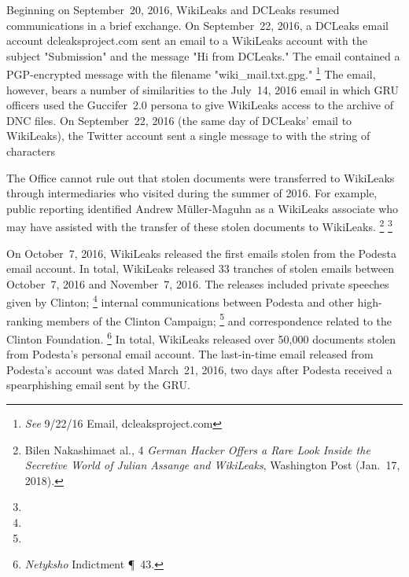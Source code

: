 Beginning on September~20, 2016, WikiLeaks and DCLeaks resumed communications in a brief exchange.
On September~22, 2016, a DCLeaks email account dcleaksproject\@gmail.com sent an email to a WikiLeaks account with the subject "Submission" and the message "Hi from DCLeaks."
The email contained a PGP-encrypted message with the filename "wiki\_mail.txt.gpg."%
\footnote{\textit{See} 9/22/16 Email, dcleaksproject\@gmail.com }
The email, however, bears a number of similarities to the July~14, 2016 email in which GRU officers used the Guccifer~2.0 persona to give WikiLeaks access to the archive of DNC files.
On September~22, 2016 (the same day of DCLeaks' email to WikiLeaks), the Twitter account \@dcleaks sent a single message to \@WikiLeaks with the string of characters 

The Office cannot rule out that stolen documents were transferred to WikiLeaks through intermediaries who visited during the summer of 2016.
For example, public reporting identified Andrew M{\"u}ller-Maguhn as a WikiLeaks associate who may have assisted with the transfer of these stolen documents to WikiLeaks.%
\footnote{Bilen Nakashimaet al., 4 \textit{German Hacker Offers a Rare Look Inside the Secretive World of Julian Assange and WikiLeaks}, Washington Post (Jan.~17, 2018).}
\footnote{}

On October~7, 2016, WikiLeaks released the first emails stolen from the Podesta email account.
In total, WikiLeaks released 33 tranches of stolen emails between October~7, 2016 and November~7, 2016.
The releases included private speeches given by Clinton;%
\footnote{}
internal communications between Podesta and other high-ranking members of the Clinton Campaign;%
\footnote{}
and correspondence related to the Clinton Foundation.%
\footnote{\textit{Netyksho} Indictment \P~43.}
In total, WikiLeaks released over 50,000 documents stolen from Podesta's  personal email account.
The last-in-time email released from Podesta's account was dated March~21, 2016, two days after Podesta received a spearphishing email sent by the GRU\null.

